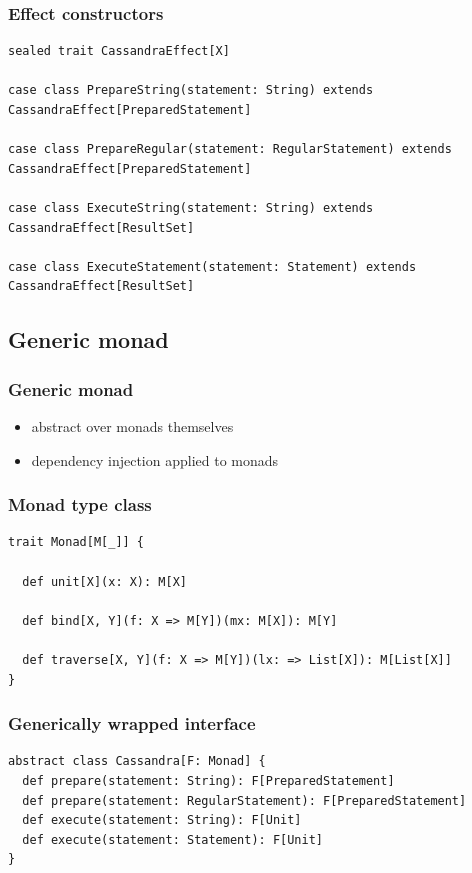 \documentclass{beamer}
\begin{document}
\begin{frame}[fragile]
\frametitle{Effect constructors}
\begin{lstlisting}
sealed trait CassandraEffect[X]

case class PrepareString(statement: String) extends CassandraEffect[PreparedStatement]

case class PrepareRegular(statement: RegularStatement) extends CassandraEffect[PreparedStatement]

case class ExecuteString(statement: String) extends CassandraEffect[ResultSet]

case class ExecuteStatement(statement: Statement) extends CassandraEffect[ResultSet]
\end{lstlisting}
\end{frame}

\subsection{Generic monad}
\begin{frame}
\frametitle{Generic monad}
\begin{itemize}
\item abstract over monads themselves
\item dependency injection applied to monads
\end{itemize}
\end{frame}

\begin{frame}[fragile]
\frametitle{Monad type class}
\begin{lstlisting}
trait Monad[M[_]] {

  def unit[X](x: X): M[X]

  def bind[X, Y](f: X => M[Y])(mx: M[X]): M[Y]
  
  def traverse[X, Y](f: X => M[Y])(lx: => List[X]): M[List[X]]
}
\end{lstlisting}
\end{frame}

\begin{frame}[fragile]
\frametitle{Generically wrapped interface}
\begin{lstlisting}
abstract class Cassandra[F: Monad] {
  def prepare(statement: String): F[PreparedStatement]
  def prepare(statement: RegularStatement): F[PreparedStatement]
  def execute(statement: String): F[Unit]
  def execute(statement: Statement): F[Unit]
}
\end{lstlisting}
\end{frame}
\end{document}
